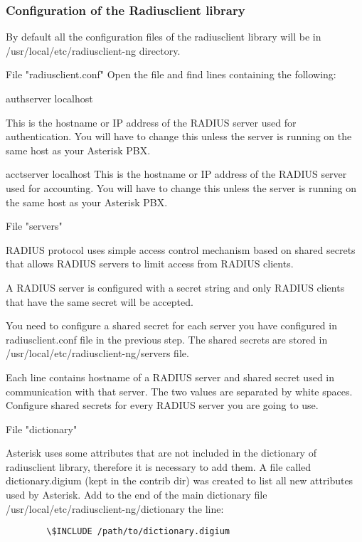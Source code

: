 \subsubsection{Configuration of the Radiusclient library}

	By default all the configuration files of the radiusclient library will
	be in /usr/local/etc/radiusclient-ng directory.

	File "radiusclient.conf"
		Open the file and find lines containing the following:

			authserver      localhost

	This is the hostname or IP address of the RADIUS server used for 
	authentication. You will have to change this unless the server is 
	running on the same host as your Asterisk PBX.

			acctserver      localhost
	This is the hostname or IP address of the RADIUS server used for 
	accounting. You will have to change this unless the server is running
	on the same host as your Asterisk PBX.

	File "servers" 

	RADIUS protocol uses simple access control mechanism based on shared
	secrets that allows RADIUS servers to limit access from RADIUS clients.

	A RADIUS server is configured with a secret string and only RADIUS 
	clients that have the same secret will be accepted.

	You need to configure a shared secret for each server you have 
	configured in radiusclient.conf file in the previous step. The shared 
	secrets are stored in /usr/local/etc/radiusclient-ng/servers file.

	Each line contains hostname of a RADIUS server and shared secret 
	used in communication with that server. The two values are separated 
	by white spaces. Configure shared secrets for every RADIUS server you 
	are going to use.

	File "dictionary"

	Asterisk uses some attributes that are not included in the 
	dictionary of radiusclient library, therefore it is necessary to add 
	them. A file called dictionary.digium (kept in the contrib dir)
	was created to list all new attributes used by Asterisk. 
	Add to the end of the main dictionary file
	/usr/local/etc/radiusclient-ng/dictionary
	the line:
\begin{verbatim}
		\$INCLUDE /path/to/dictionary.digium
\end{verbatim}


